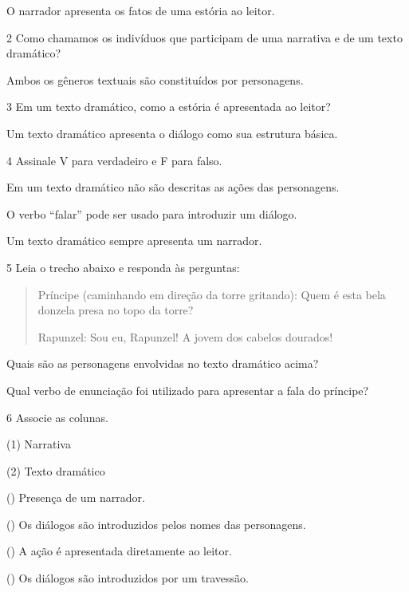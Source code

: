 O narrador apresenta os fatos de uma estória ao leitor.


\num{2} Como chamamos os indivíduos que participam de uma narrativa e de um
texto dramático?

Ambos os gêneros textuais são constituídos por personagens.


\num{3} Em um texto dramático, como a estória é apresentada ao leitor?

Um texto dramático apresenta o diálogo como sua estrutura básica.


\num{4} Assinale V para verdadeiro e F para falso.

\begin{boxlist}
\item Em um texto dramático não são descritas as ações das personagens. 

\item O verbo ``falar'' pode ser usado para introduzir um diálogo. 

\item Um texto dramático sempre apresenta um narrador. 
\end{boxlist}

\num{5} Leia o trecho abaixo e responda às perguntas:

\begin{quote}
Príncipe (caminhando em direção da torre gritando): Quem é esta bela
donzela presa no topo da torre?

Rapunzel: Sou eu, Rapunzel! A jovem dos cabelos dourados!
\end{quote}

\begin{escolha}
\item Quais são as personagens envolvidas no texto dramático acima?



\item Qual verbo de enunciação foi utilizado para apresentar a fala do príncipe?

\end{escolha}

\num{6} Associe as colunas.

\begin{multicols}{2}
(1) Narrativa\medskip

(2) Texto dramático

\columnbreak

() Presença de um narrador.

() Os diálogos são introduzidos pelos nomes das personagens.

() A ação é apresentada diretamente ao leitor.

() Os diálogos são introduzidos por um travessão.
\end{multicols}

